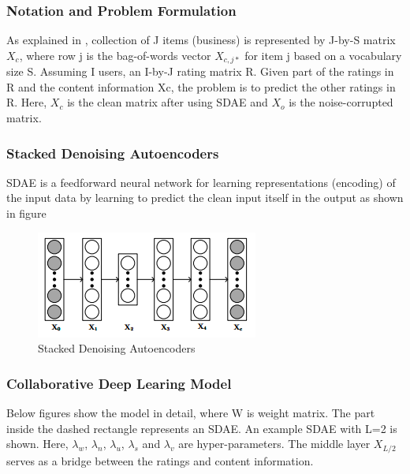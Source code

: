 \documentclass[11pt]{article}
\begin{document}
		\subsubsection{Notation and Problem Formulation}
		As explained in \cite{cdl}, collection of J items (business) is represented by J-by-S matrix $X_c$, where row j is the bag-of-words vector $X_{c,j*}$ for item j based on a vocabulary size S. Assuming I users, an I-by-J rating matrix R. Given part of the ratings in R and the content information Xc, the problem is to predict the other ratings in R. Here, $X_c$ is the clean matrix after using SDAE and $X_o$ is the noise-corrupted matrix.
		  
		\subsubsection{Stacked Denoising Autoencoders}
		SDAE \cite{sdae} is a feedforward neural network for learning representations (encoding) of the input data by learning to predict the clean input itself in the output as shown in figure
		\begin{figure}[h]
			\centering
			\includegraphics[scale=0.7]{sdae.png}
			\caption{Stacked Denoising Autoencoders}
		\end{figure}
		
		\subsubsection{Collaborative Deep Learing Model}
		Below figures show the model in detail, where W is weight matrix. The part inside the dashed rectangle represents an SDAE. An example SDAE with L=2 is shown. Here, $\lambda_w$, $\lambda_n$, $\lambda_u$, $\lambda_s$ and $\lambda_v$ are hyper-parameters. The middle layer $X_{L/2}$ serves as a bridge between the ratings and content information. 
		
\end{document}
